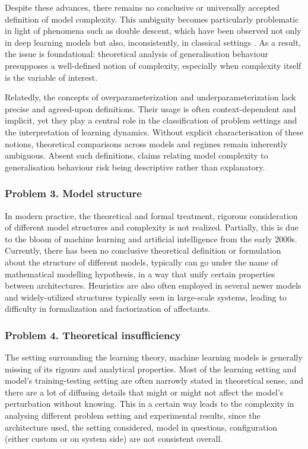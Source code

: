 Despite these advances, there remains no conclusive or universally accepted definition of model complexity. This ambiguity becomes particularly problematic in light of phenomena such as double descent, which have been observed not only in deep learning models but also, inconsistently, in classical settings \cite{belkin_reconciling_2019}. As a result, the issue is foundational: theoretical analysis of generalisation behaviour presupposes a well-defined notion of complexity, especially when complexity itself is the variable of interest.

Relatedly, the concepts of overparameterization and underparameterization lack precise and agreed-upon definitions. Their usage is often context-dependent and implicit, yet they play a central role in the classification of problem settings and the interpretation of learning dynamics. Without explicit characterisation of these notions, theoretical comparisons across models and regimes remain inherently ambiguous. Absent such definitions, claims relating model complexity to generalisation behaviour risk being descriptive rather than explanatory.

\subsubsection*{Problem 3. Model structure}

In modern practice, the theoretical and formal treatment, rigorous consideration of different model structures and complexity is not realized. Partially, this is due to the bloom of machine learning and artificial intelligence from the early 2000s. Currently, there has been no conclusive theoretical definition or formulation about the structure of different models, typically can go under the name of mathematical modelling hypothesis, in a way that unify certain properties between architectures. Heuristics are also often employed in several newer models and widely-utilized structures typically seen in large-scale systems, leading to difficulty in formalization and factorization of affectants. 

\subsubsection*{Problem 4. Theoretical insufficiency}

The setting surrounding the learning theory, machine learning models is generally missing of its rigours and analytical properties. Most of the learning setting and model's training-testing setting are often narrowly stated in theoretical sense, and there are a lot of diffusing details that might or might not affect the model's perturbation without knowing. This in a certain way leads to the complexity in analysing different problem setting and experimental results, since the architecture used, the setting considered, model in questions, configuration (either custom or on system side) are not consistent overall. 

